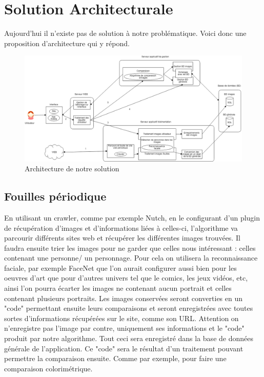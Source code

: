 \documentclass[a4paper,12pt]{article}
\begin{document}
\section{Solution Architecturale}
Aujourd'hui il n'existe pas de solution à notre problématique. Voici donc une proposition d'architecture qui y répond. 

\begin{figure}[!ht]
    \centering
        \includegraphics[scale=0.4, angle=-90]{images/SchemaArchitecture.png}
        \caption{Architecture de notre solution}
    \end{figure}

    
 \subsection{Fouilles périodique} 
 En utilisant un crawler, comme par exemple Nutch, en le configurant d'un plugin de récupération d'images et d'informations liées à celles-ci, l'algorithme va parcourir différents sites web et récupérer les différentes images trouvées. Il faudra ensuite trier les images pour ne garder que celles nous intéressant : celles contenant une personne/ un personnage. Pour cela on utilisera la reconnaissance faciale, par exemple FaceNet que l'on aurait configurer aussi bien pour les oeuvres d'art que pour d'autres univers tel que le comics, les jeux vidéos, etc,  ainsi l'on pourra écarter les images ne contenant aucun portrait et celles contenant plusieurs portraits. Les images conservées seront converties en un "code" permettant ensuite leurs comparaisons et seront enregistrées avec toutes sortes d'informations récupérées sur le site, comme son URL. Attention on n'enregistre pas l'image par contre, uniquement ses informations et le "code" produit par notre algorithme. Tout ceci sera enregistré dans la base de données générale de l'application. Ce "code" sera le résultat d'un traitement pouvant permettre la comparaison ensuite. Comme par exemple, pour faire une comparaison colorimétrique. 
\end{document}
